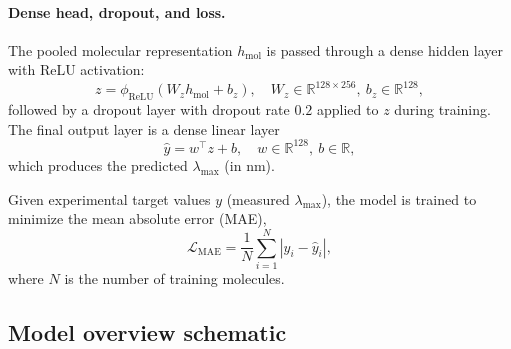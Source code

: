 \documentclass[11pt,a4paper]{article}
\begin{document}
\paragraph{Dense head, dropout, and loss.}
The pooled molecular representation $h_{\mathrm{mol}}$ is passed through a dense hidden layer with ReLU activation:
\begin{equation}
  z = \phi_{\mathrm{ReLU}}(W_z h_{\mathrm{mol}} + b_z), \quad W_z \in \mathbb{R}^{128 \times 256},\ b_z \in \mathbb{R}^{128},
\end{equation}
followed by a dropout layer with dropout rate $0.2$ applied to $z$ during training. The final output layer is a dense linear layer
\begin{equation}
  \hat{y} = w^{\top} z + b, \quad w \in \mathbb{R}^{128},\ b \in \mathbb{R},
\end{equation}
which produces the predicted $\lambda_{\max}$ (in nm).

Given experimental target values $y$ (measured $\lambda_{\max}$), the model is trained to minimize the mean absolute error (MAE),
\begin{equation}
  \mathcal{L}_{\mathrm{MAE}} = \frac{1}{N} \sum_{i=1}^{N} \left| y_i - \hat{y}_i \right|,
\end{equation}
where $N$ is the number of training molecules.

\subsection{Model overview schematic}
\end{document}
